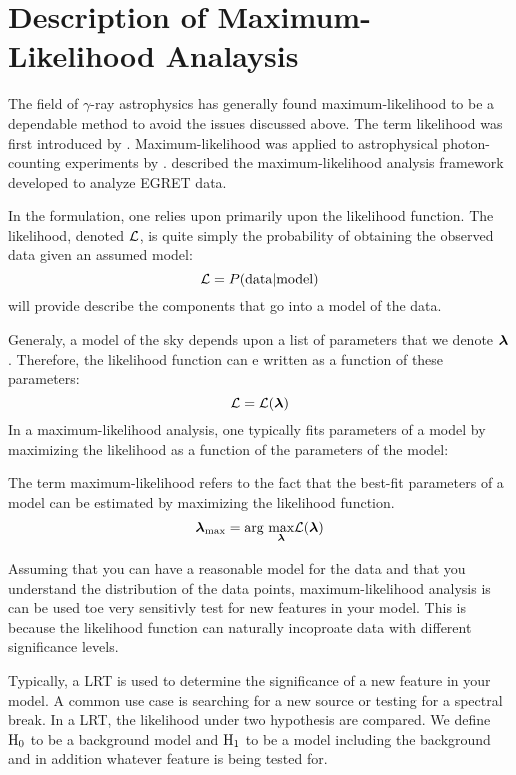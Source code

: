 \section{Description of Maximum-Likelihood Analaysis}

The field of $\gamma$-ray astrophysics has generally
found maximum-likelihood to be a dependable method to
avoid the issues discussed above.  The term likelihood was
first introduced by \cite{fisher_1925_statistical-methods}.
Maximum-likelihood was applied to astrophysical photon-counting
experiments by \cite{cash_1979_parameter-estimation}.
\cite{mattox_1996a_likelihood-analysis} described the maximum-likelihood
analysis framework developed to analyze \ac{EGRET} data.

In the formulation, one relies upon primarily upon the likelihood
function.  The likelihood, denoted $\mathcal{L}$, is quite simply the
probability of obtaining the observed data given an assumed model:
\begin{equation}
  \mathcal{L} = P(\text{data}|\text{model})
\end{equation}
 will provide describe the
components that go into a model of the data.

Generaly, a model of the sky depends upon a list of parameters that we
denote $\boldsymbol{\lambda}$.  Therefore, the likelihood function can e written
as a function of these parameters:
\begin{equation}
  \mathcal{L} = \mathcal{L}(\boldsymbol{\lambda})
\end{equation}
In a maximum-likelihood analysis, one typically fits parameters of a model
by maximizing the likelihood as a function of the parameters of the model:

The term maximum-likelihood refers to the fact that the best-fit
parameters of a model can be estimated by maximizing the likelihood
function.
\begin{equation}
\boldsymbol{\lambda}_\text{max} = \underset{}{\text{arg }}\underset{\boldsymbol{\lambda}}{\text{max}} \mathcal{L}(\boldsymbol{\lambda})
\end{equation}

Assuming that you can have a reasonable model for the data and that
you understand the distribution of the data points, maximum-likelihood
analysis is can be used toe very sensitivly test for new features in
your model.  This is because the likelihood function can naturally
incoproate data with different significance levels.

Typically, a \ac{LRT} is used to determine the significance of
a new feature in your model. A common use case is searching for a new source
or testing for a spectral break. In a \ac{LRT}, the likelihood
under two hypothesis are compared. We define $\text{H}_0$ to be 
a background model and $\text{H}_1$ to be a model including
the background and in addition whatever feature is being tested for.

